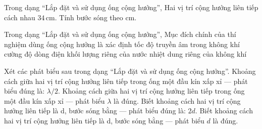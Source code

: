 \begin{ex}
Trong dạng “Lắp đặt và sử dụng ống cộng hưởng”, Hai vị trí cộng hưởng liên tiếp cách nhau $34\,\text{cm}$. Tính bước sóng theo cm.
\end{ex}

\begin{ex}
Trong dạng “Lắp đặt và sử dụng ống cộng hưởng”, Mục đích chính của thí nghiệm dùng ống cộng hưởng là xác định
\choice
{\True tốc độ truyền âm trong không khí}
{cường độ dòng điện}
{khối lượng riêng của nước}
{nhiệt dung riêng của không khí}
\end{ex}

\begin{ex}
Xét các phát biểu sau trong dạng “Lắp đặt và sử dụng ống cộng hưởng”.
\choiceTF
{\True Khoảng cách giữa hai vị trí cộng hưởng liên tiếp trong ống một đầu kín xấp xỉ — phát biểu đúng là: $\lambda/2$.}
{Khoảng cách giữa hai vị trí cộng hưởng liên tiếp trong ống một đầu kín xấp xỉ — phát biểu $\lambda$ là đúng.}
{\True Biết khoảng cách hai vị trí cộng hưởng liên tiếp là d, bước sóng bằng — phát biểu đúng là: $2d$.}
{Biết khoảng cách hai vị trí cộng hưởng liên tiếp là d, bước sóng bằng — phát biểu $d$ là đúng.}
\end{ex}

